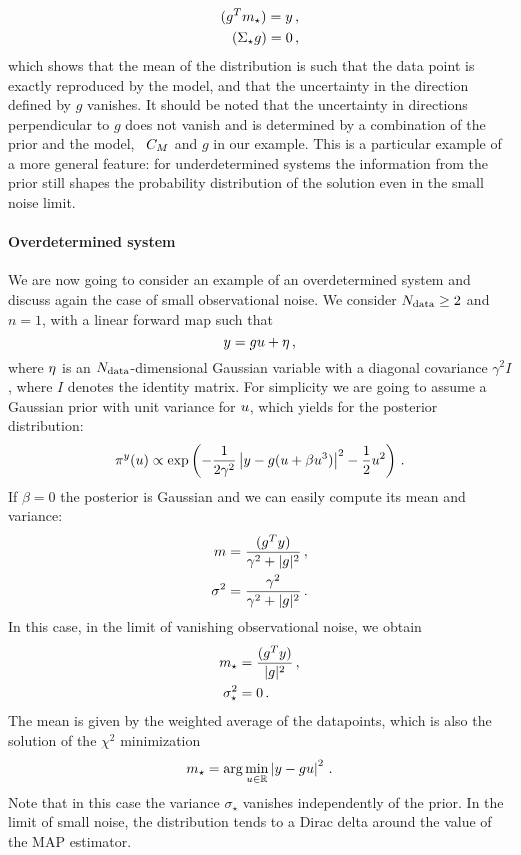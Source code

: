 \begin{align}
  (g^T m_\star) = y \, , \\
  (\Sigma_\star g) = 0 \, ,
\end{align}
which shows that the mean of the distribution is such that the data point is
exactly reproduced by the model, and that the uncertainty in the direction
defined by $g$ vanishes. It should be noted that the uncertainty in directions
perpendicular to $g$ does not vanish and is determined by a combination of the
prior and the model, \viz\ $C_M$ and $g$ in our example. This is a
particular example of a more general feature: for underdetermined systems the
information from the prior still shapes the probability distribution of the
solution even in the small noise limit.  

\paragraph{Overdetermined system}
We are now going to consider an example of an overdetermined system and discuss
again the case of small observational noise. We consider $N_{\rm data}\geq 2$ and
$n=1$, with a linear forward map such that
\begin{equation}
 \label{eq:OverDetForwMap}
 y = g u  + \eta\, ,
\end{equation} 
where $\eta$ is an $N_{\rm data}$-dimensional Gaussian variable with a diagonal
covariance $\gamma^2 I$, where $I$ denotes the identity matrix. For simplicity
we are going to assume a Gaussian prior with unit variance for $u$, which yields
for the posterior distribution:
\begin{equation}
  \label{eq:OverDetPost}
  \pi^y(u) \propto 
    \exp\left(
      -\frac{1}{2\gamma^2} \left| y - g(u + \beta u^3)\right|^2
      -\frac12 u^2
    \right)\, .
\end{equation} 
If $\beta=0$ the posterior is Gaussian and we can easily compute its mean and variance: 
\begin{align}
  m &= \frac{(g^T y)}{\gamma^2 + |g|^2} \, , \\
  \sigma^2 &=
    \frac{\gamma^2}{\gamma^2 + |g|^2}\, .
\end{align}
In this case, in the limit of vanishing observational noise, we obtain
\begin{align}
  m_\star &= \frac{(g^T y)}{|g|^2} \, ,\\
  \sigma_\star^2 &= 0\, .
\end{align}
The mean is given by the weighted average of the datapoints, which is also the solution of the $\chi^2$ minimization
\begin{equation}
  m_\star = \arg\min_{u\in\mathbb{R}} \left|y - g u\right|^2\, .
\end{equation}
Note that in this case the variance $\sigma_\star$ vanishes independently of the
prior. In the limit of small noise, the distribution tends to a Dirac delta
around the value of the MAP estimator.  

